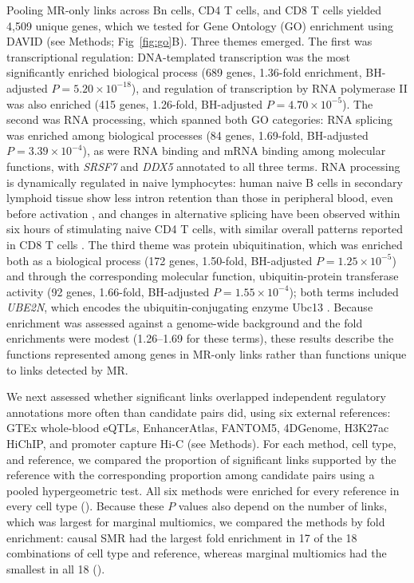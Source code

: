 \noindent Pooling MR-only links across Bn cells, CD4 T cells, and CD8 T cells yielded 4,509 unique genes, which we tested for Gene Ontology (GO) enrichment using DAVID \cite{sherman2022david} (see Methods; Fig~\ref{fig:go}B). Three themes emerged. The first was transcriptional regulation: DNA-templated transcription was the most significantly enriched biological process (689 genes, 1.36-fold enrichment, BH-adjusted \(P=5.20\times10^{-18}\)), and regulation of transcription by RNA polymerase II was also enriched (415 genes, 1.26-fold, BH-adjusted \(P=4.70\times10^{-5}\)). The second was RNA processing, which spanned both GO categories: RNA splicing was enriched among biological processes (84 genes, 1.69-fold, BH-adjusted \(P=3.39\times10^{-4}\)), as were RNA binding and mRNA binding among molecular functions, with \textit{SRSF7} and \textit{DDX5} annotated to all three terms. RNA processing is dynamically regulated in naive lymphocytes: human naive B cells in secondary lymphoid tissue show less intron retention than those in peripheral blood, even before activation \cite{ogrady2022splicing}, and changes in alternative splicing have been observed within six hours of stimulating naive CD4 T cells, with similar overall patterns reported in CD8 T cells \cite{zisman2025splicing}. The third theme was protein ubiquitination, which was enriched both as a biological process (172 genes, 1.50-fold, BH-adjusted \(P=1.25\times10^{-5}\)) and through the corresponding molecular function, ubiquitin-protein transferase activity (92 genes, 1.66-fold, BH-adjusted \(P=1.55\times10^{-4}\)); both terms included \textit{UBE2N}, which encodes the ubiquitin-conjugating enzyme Ubc13 \cite{yamamoto2006ubc13}. Because enrichment was assessed against a genome-wide background and the fold enrichments were modest (1.26--1.69 for these terms), these results describe the functions represented among genes in MR-only links rather than functions unique to links detected by MR.

\noindent We next assessed whether significant links overlapped independent regulatory annotations more often than candidate pairs did, using six external references: GTEx whole-blood eQTLs, EnhancerAtlas, FANTOM5, 4DGenome, H3K27ac HiChIP, and promoter capture Hi-C (see Methods). For each method, cell type, and reference, we compared the proportion of significant links supported by the reference with the corresponding proportion among candidate pairs using a pooled hypergeometric test. All six methods were enriched for every reference in every cell type (). Because these \(P\) values also depend on the number of links, which was largest for marginal multiomics, we compared the methods by fold enrichment: causal SMR had the largest fold enrichment in 17 of the 18 combinations of cell type and reference, whereas marginal multiomics had the smallest in all 18 ().

